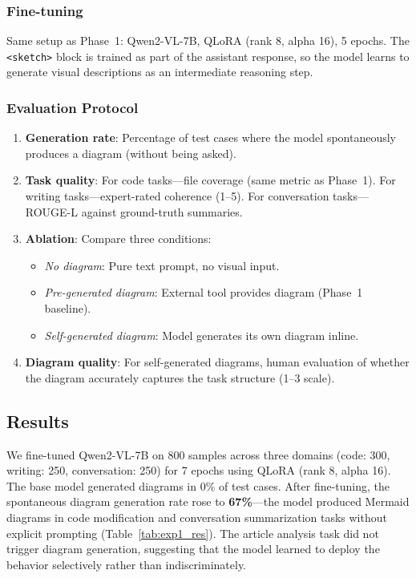 \documentclass[11pt,a4paper]{article}
\begin{document}
\subsubsection{Fine-tuning}

Same setup as Phase~1: Qwen2-VL-7B, QLoRA (rank 8, alpha 16), 5 epochs. The \texttt{<sketch>} block is trained as part of the assistant response, so the model learns to generate visual descriptions as an intermediate reasoning step.

\subsubsection{Evaluation Protocol}

\begin{enumerate}[nosep]
\item \textbf{Generation rate}: Percentage of test cases where the model spontaneously produces a diagram (without being asked).
\item \textbf{Task quality}: For code tasks---file coverage (same metric as Phase~1). For writing tasks---expert-rated coherence (1--5). For conversation tasks---ROUGE-L against ground-truth summaries.
\item \textbf{Ablation}: Compare three conditions:
  \begin{itemize}[nosep]
  \item \textit{No diagram}: Pure text prompt, no visual input.
  \item \textit{Pre-generated diagram}: External tool provides diagram (Phase~1 baseline).
  \item \textit{Self-generated diagram}: Model generates its own diagram inline.
  \end{itemize}
\item \textbf{Diagram quality}: For self-generated diagrams, human evaluation of whether the diagram accurately captures the task structure (1--3 scale).
\end{enumerate}

\subsection{Results}

We fine-tuned Qwen2-VL-7B on 800 samples across three domains (code: 300, writing: 250, conversation: 250) for 7 epochs using QLoRA (rank 8, alpha 16). The base model generated diagrams in 0\% of test cases. After fine-tuning, the spontaneous diagram generation rate rose to \textbf{67\%}---the model produced Mermaid diagrams in code modification and conversation summarization tasks without explicit prompting (Table~\ref{tab:exp1_res}). The article analysis task did not trigger diagram generation, suggesting that the model learned to deploy the behavior selectively rather than indiscriminately.
\end{document}
